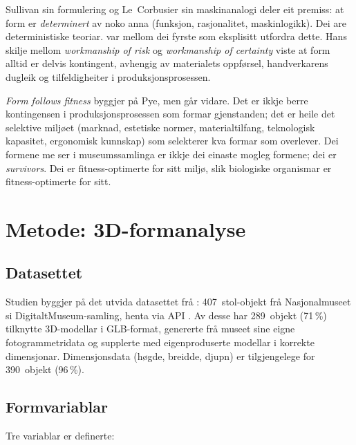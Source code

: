 \documentclass[12pt,a4paper]{article}
\begin{document}
Sullivan sin formulering \citep{sullivan1896} og Le~Corbusier sin maskinanalogi \citep{corbusier1923} deler eit premiss: at form er \emph{determinert} av noko anna (funksjon, rasjonalitet, maskinlogikk). Dei are deterministiske teoriar. \citet{pye1968} var mellom dei fyrste som eksplisitt utfordra dette. Hans skilje mellom \emph{workmanship of risk} og \emph{workmanship of certainty} viste at form alltid er delvis kontingent, avhengig av materialets oppf\o{}rsel, handverkarens dugleik og tilfeldigheiter i produksjonsprosessen.

\emph{Form follows fitness} byggjer p\aa{} Pye, men g\aa{}r vidare. Det er ikkje berre kontingensen i produksjonsprosessen som formar gjenstanden; det er heile det selektive milj\o{}et (marknad, estetiske normer, materialtilfang, teknologisk kapasitet, ergonomisk kunnskap) som selekterer kva formar som overlever. Dei formene me ser i museumssamlinga er ikkje dei einaste mogleg formene; dei er \emph{survivors}. Dei er fitness-optimerte for sitt milj\o{}, slik biologiske organismar er fitness-optimerte for sitt.

\section{Metode: 3D-formanalyse}

\subsection{Datasettet}

Studien byggjer p\aa{} det utvida datasettet fr\aa{} \citet{finne2026a}: 407~stol-objekt fr\aa{} Nasjonalmuseet si DigitaltMuseum-samling, henta via API \citep{kulturit}. Av desse har 289~objekt (71\,\%) tilknytte 3D-modellar i GLB-format, genererte fr\aa{} museet sine eigne fotogrammetridata og supplerte med eigenproduserte modellar i korrekte dimensjonar. Dimensjonsdata (h\o{}gde, breidde, djupn) er tilgjengelege for 390~objekt (96\,\%).

\subsection{Formvariablar}

Tre variablar er definerte:
\end{document}
